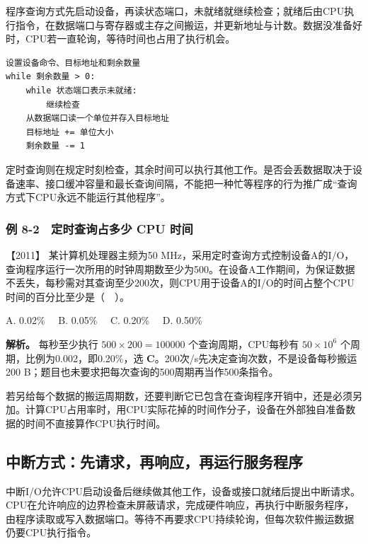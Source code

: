 程序查询方式先启动设备，再读状态端口，未就绪就继续检查；就绪后由CPU执行指令，在数据端口与寄存器或主存之间搬运，并更新地址与计数。数据没准备好时，CPU若一直轮询，等待时间也占用了执行机会。

\par\medskip\noindent
\begin{minipage}{\linewidth}
\begin{verbatim}
设置设备命令、目标地址和剩余数量
while 剩余数量 > 0:
    while 状态端口表示未就绪:
        继续检查
    从数据端口读一个单位并存入目标地址
    目标地址 += 单位大小
    剩余数量 -= 1
\end{verbatim}
\end{minipage}\par\medskip

定时查询则在规定时刻检查，其余时间可以执行其他工作。是否会丢数据取决于设备速率、接口缓冲容量和最长查询间隔，不能把一种忙等程序的行为推广成``查询方式下CPU永远不能运行其他程序''。

\subsubsection{例 8-2　定时查询占多少 CPU 时间}\label{co-ex8-2}

\noindent{}【2011】 某计算机处理器主频为50 MHz，采用定时查询方式控制设备A的I/O，查询程序运行一次所用的时钟周期数至少为500。在设备A工作期间，为保证数据不丢失，每秒需对其查询至少200次，则CPU用于设备A的I/O的时间占整个CPU时间的百分比至少是（　）。

A. 0.02\%　 B. 0.05\%　 C. 0.20\%　 D. 0.50\%


\textbf{解析。} 每秒至少执行 \(500\times200=100000\) 个查询周期，CPU每秒有 \(50\times10^6\) 个周期，比例为0.002，即0.20\%，选 \textbf{C}。200次/s先决定查询次数，不是设备每秒搬运200 B；题目也未要求把每次查询的500周期再当作500条指令。

若另给每个数据的搬运周期数，还要判断它已包含在查询程序开销中，还是必须另加。计算CPU占用率时，用CPU实际花掉的时间作分子，设备在外部独自准备数据的时间不直接算作CPU执行时间。

\subsection{中断方式：先请求，再响应，再运行服务程序}\label{co-08-03}

中断I/O允许CPU启动设备后继续做其他工作，设备或接口就绪后提出中断请求。CPU在允许响应的边界检查未屏蔽请求，完成硬件响应，再执行中断服务程序，由程序读取或写入数据端口。等待不再要求CPU持续轮询，但每次软件搬运数据仍要CPU执行指令。

